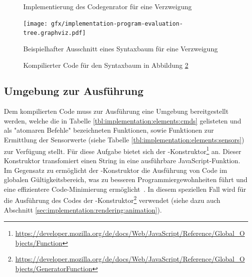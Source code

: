\begin{figure}
  
  \caption{Implementierung des Codegenrator für eine Verzweigung}
  \label{fig:implementation:evaluation:codegenerator}
\end{figure}

\begin{figure}
  \centering
  \texttt{[image: gfx/implementation-program-evaluation-tree.graphviz.pdf]}
  \caption{Beispielhafter Ausschnitt eines Syntaxbaum für eine Verzweigung}
  \label{fig:implementation:evaluation:tree-render}
\end{figure}

\begin{figure}
  
  \caption{Kompilierter Code für den Syntaxbaum in Abbildung \ref{fig:implementation:evaluation:tree-render}}
  \label{fig:implementation:evaluation:tree-result}
\end{figure}

\subsection[Umgebung zur Ausführung]{Umgebung zur Ausführung\protect\footnotemark}
\label{sec:implementation:evaluation:environment}


Dem kompilierten Code muss zur Ausführung eine Umgebung bereitgestellt werden, welche die in Tabelle \ref{tbl:implementation:elements:cmds} gelisteten und als "atomaren Befehle" bezeichneten Funktionen, sowie Funktionen zur Ermittlung der Sensorwerte (siehe Tabelle \ref{tbl:implementation:elements:sensors}) zur Verfügung stellt. Für diese Aufgabe bietet sich der -Konstruktor\footnote{\url{https://developer.mozilla.org/de/docs/Web/JavaScript/Reference/Global_Objects/Function}} an. Dieser Konstruktor transfomiert einen String in eine ausführbare JavaScript-Funktion. Im Gegensatz zu  ermöglicht der -Konstruktor die Ausführung von Code im globalen Gültigkeitsbereich, was zu besseren Programmiergewohnheiten führt und eine effizientere Code-Minimierung ermöglicht~\cite{mdn-function}. In diesem speziellen Fall wird für die Ausführung des Codes der -Konstruktor\footnote{\url{https://developer.mozilla.org/de/docs/Web/JavaScript/Reference/Global_Objects/GeneratorFunction}} verwendet (siehe dazu auch Abschnitt \ref{sec:implementation:rendering:animation}).

